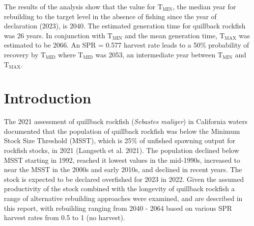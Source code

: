 \documentclass[11pt,
  english,
  letterpaper,
]{article}
\begin{document}

The results of the analysis show that the value for {\(\text{T}_\text{MIN}\)\leavevmode\tagmcend\tagstructend}, the median year for rebuilding to the target level in the absence of fishing since the year of declaration (2023), is 2040. The estimated generation time for quillback rockfish was 26 years. In conjunction with {\(\text{T}_\text{MIN}\)\leavevmode\tagmcend\tagstructend} and the mean generation time, {\(\text{T}_\text{MAX}\)\leavevmode\tagmcend\tagstructend} was estimated to be 2066. An SPR = 0.577 harvest rate leads to a 50\% probability of recovery by {\(\text{T}_\text{MID}\)\leavevmode\tagmcend\tagstructend} where {\(\text{T}_\text{MID}\)\leavevmode\tagmcend\tagstructend} was 2053, an intermediate year between {\(\text{T}_\text{MIN}\)\leavevmode\tagmcend\tagstructend} and {\(\text{T}_\text{MAX}\)\leavevmode\tagmcend\tagstructend}.

\leavevmode\tagmcend\tagstructend\par

\pagebreak
\setlength{\parskip}{5mm plus1mm minus1mm}
\setcounter{page}{1}
\renewcommand{\thefigure}{\arabic{figure}}
\renewcommand{\thetable}{\arabic{table}}
\setcounter{table}{0}
\setcounter{figure}{0}

\setlength\parskip{0.2em plus 0.1em minus 0.2em}


\hypertarget{introduction}{%
\section{Introduction}\label{introduction}}

\leavevmode\tagmcend\tagstructend


The 2021 assessment of quillback rockfish (\emph{Sebastes maliger}) in California waters documented that the population of quillback rockfish was below the Minimum Stock Size Threshold (MSST), which is 25\% of unfished spawning output for rockfish stocks, in 2021 {(Langseth et al. 2021)\leavevmode\tagmcend\tagstructend}. The population declined below MSST starting in 1992, reached it lowest values in the mid-1990s, increased to near the MSST in the 2000s and early 2010s, and declined in recent years. The stock is expected to be declared overfished for 2023 in 2022. Given the assumed productivity of the stock combined with the longevity of quillback rockfish a range of alternative rebuilding approaches were examined, and are described in this report, with rebuilding ranging from 2040 - 2064 based on various SPR harvest rates from 0.5 to 1 (no harvest).
\end{document}
